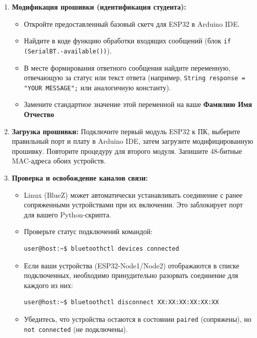 \begin{enumerate}[nosep, leftmargin=*]
    \item \textbf{Модификация прошивки (идентификация студента):}
    \begin{itemize}
        \item Откройте предоставленный базовый скетч для ESP32 в Arduino IDE.
        \item Найдите в коде функцию обработки входящих сообщений (блок \texttt{if (SerialBT.-\allowbreak available())}).
        \item В месте формирования ответного сообщения найдите переменную, отвечающую за статус или текст ответа (например, \texttt{String response = "YOUR MESSAGE";} или аналогичную константу).
        \item Замените стандартное значение этой переменной на ваше \textbf{Фамилию Имя Отчество}
    \end{itemize}

    \item \textbf{Загрузка прошивки:} Подключите первый модуль ESP32 к ПК, выберите правильный порт и плату в Arduino IDE, затем загрузите модифицированную прошивку. Повторите процедуру для второго модуля. Запишите 48-битные MAC-адреса обоих устройств.

    \item \textbf{Проверка и освобождение каналов связи:}
    \begin{itemize}
        \item Linux (BlueZ) может автоматически устанавливать соединение с ранее сопряженными устройствами при их включении. Это заблокирует порт для вашего Python-скрипта.
        \item Проверьте статус подключений командой:
        \begin{lstlisting}
user@host:~$ bluetoothctl devices connected
        \end{lstlisting}
        \item Если ваши устройства (ESP32-Node1/Node2) отображаются в списке подключенных, необходимо принудительно разорвать соединение для каждого из них:
        \begin{lstlisting}
user@host:~$ bluetoothctl disconnect XX:XX:XX:XX:XX:XX
        \end{lstlisting}
        \item Убедитесь, что устройства остаются в состоянии \texttt{paired} (сопряжены), но \texttt{not connected} (не подключены).
    \end{itemize}


\end{enumerate}
